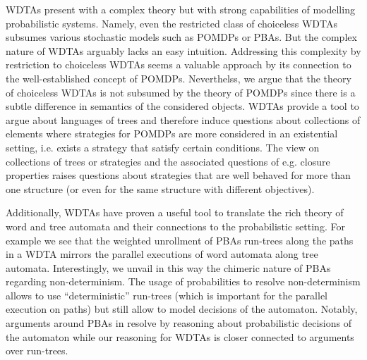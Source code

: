 \acp{WDTA} present with a complex theory but with strong capabilities of
modelling probabilistic systems. Namely, even the restricted class of
choiceless \acp{WDTA} subsumes various stochastic models such as \acp{POMDP} or
\acp{PBA}. But the complex nature of \acp{WDTA} arguably lacks an easy
intuition. Addressing this complexity by restriction to choiceless \acp{WDTA}
seems a valuable approach by its connection to the well-established concept of
\acp{POMDP}. Neverthelss, we argue that the theory of choiceless \acp{WDTA} is
not subsumed by the theory of \acp{POMDP} since there is a subtle difference in
semantics of the considered objects. \acp{WDTA} provide a tool to argue about
languages of trees and therefore induce questions about collections of elements
where strategies for \acp{POMDP} are more considered in an existential setting,
i.e. exists a strategy that satisfy certain conditions. The view on collections
of trees or strategies and the associated questions of e.g. closure properties
raises questions about strategies that are well behaved for more than one
structure (or even for the same structure with different objectives).

Additionally, \acp{WDTA} have proven a useful tool to translate the rich theory
of word and tree automata and their connections to the probabilistic setting.
For example we see that the weighted unrollment of \acp{PBA} run-trees along
the paths in a \ac{WDTA} mirrors the parallel executions of word automata along
tree automata. Interestingly, we unvail in this way the chimeric nature of
\acp{PBA} regarding non-determinism. The usage of probabilities to resolve
non-determinism allows to use \enquote{deterministic} run-trees (which is
important for the parallel execution on paths) but still allow to model
decisions of the automaton. Notably, arguments around \acp{PBA} in
\cite{Groesser} resolve by reasoning about probabilistic decisions of the
automaton while our reasoning for \acp{WDTA} is closer connected to arguments
over run-trees.

